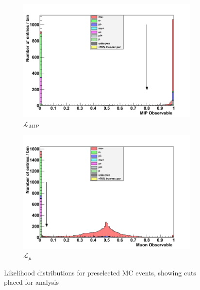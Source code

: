 \begin{figure}[!h]
	\begin{subfigure}[t]{0.49\textwidth}	
		\includegraphics[width=\textwidth]{figures/numu/Cuts/numu/Miplik_run12}
		\caption{$\mathcal{L}_{MIP}$}
	\end{subfigure}
	\begin{subfigure}[t]{0.49\textwidth}	
		\includegraphics[width=\textwidth]{figures/numu/Cuts/numu/Mulik_run12}
		\caption{$\mathcal{L}_{\mu}$}
	\end{subfigure}
	\caption{Likelihood distributions for preselected MC events, showing cuts placed for \numu analysis}
	\label{fig:numu_likelihoods}
\end{figure}

